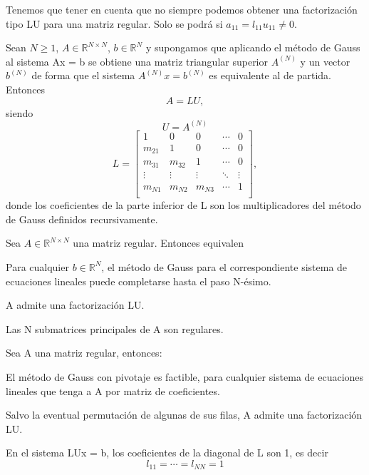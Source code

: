 Tenemos que tener en cuenta que no siempre podemos obtener una factorización tipo LU para una matriz regular. Solo se podrá si $a_{11} = l_{11}u_{11} \neq 0$.

\begin{nprop}
Sean $N \geq 1$, $A \in \mathbb{R}^{N \times N}$, $b \in \mathbb{R}^N$ y supongamos que aplicando el método de Gauss al sistema Ax = b se obtiene una matriz triangular superior $A^{(N)}$ y un vector $b^{(N)}$ de forma que el sistema $A^{(N)}x = b^{(N)}$ es equivalente al de partida. Entonces
\[ A = LU,\]
siendo
\[ U = A^{(N)} \]
\[ L = \begin{bmatrix}
1 & 0 & 0 & \cdots & 0 \\
m_{21} & 1 & 0 & \cdots & 0 \\
m_{31} & m_{32} & 1 & \cdots & 0 \\
\vdots &  \vdots & \vdots & \ddots & \vdots \\
m_{N1} & m_{N2} & m_{N3} & \cdots & 1 \\
\end{bmatrix}, \]
donde los coeficientes de la parte inferior de L son los multiplicadores del método de Gauss definidos recursivamente.
\end{nprop}

\begin{nth}
Sea $A \in \mathbb{R}^{N \times N}$ una matriz regular. Entonces equivalen
	\begin{nlist}
	\item Para cualquier $b \in \mathbb{R}^N$, el método de Gauss para el correspondiente sistema de ecuaciones lineales puede completarse hasta el paso N-ésimo.
	\item A admite una factorización LU.
	\item Las N submatrices principales de A son regulares.
	\end{nlist}
\end{nth}

\begin{nth}
Sea A una matriz regular, entonces:
	\begin{nlist}
	\item El método de Gauss con pivotaje es factible, para cualquier sistema de ecuaciones lineales que tenga a A por matriz de coeficientes.
	\item Salvo la eventual permutación de algunas de sus filas, A admite una factorización LU.
	\end{nlist}
\end{nth}

\begin{ndef}
			En el sistema LUx = b, los coeficientes de la diagonal de L son 1, es decir
\[ l_{11} = \cdots = l_{NN} = 1 \]
\end{ndef}

